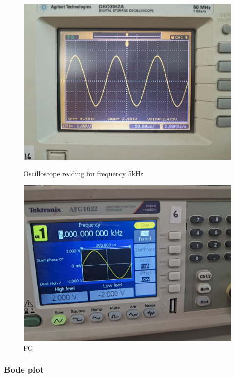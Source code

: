 \documentclass[a4paper,12pt]{article}
\begin{document}
\begin{figure}[H]
    \centering
    \begin{minipage}[b]{0.45\textwidth}
        \centering
        \includegraphics[width=\textwidth]{fig/lp/5ko.jpeg}
        \caption{Oscilloscope reading for frequency 5kHz}
    \end{minipage}
    \hfill
    \begin{minipage}[b]{0.45\textwidth}
        \centering
        \includegraphics[width=\textwidth]{fig/lp/5k.jpeg}
        \caption{FG}
    \end{minipage}
\end{figure}
\subsubsection{Bode plot}
\end{document}
